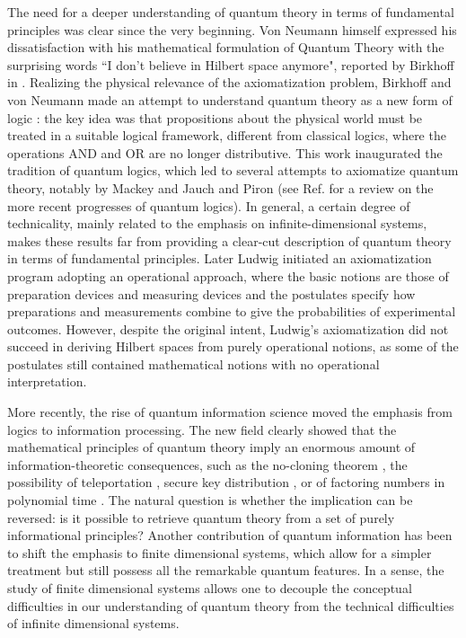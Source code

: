 \documentclass[12pt,aps,pra,showpacs,groupedaddress]{revtex4-1}
\begin{document}
The need for a deeper understanding of quantum theory in terms of  fundamental principles was clear
since the very beginning.  Von Neumann himself expressed his dissatisfaction with his mathematical formulation of Quantum Theory with the surprising words ``I don't believe in Hilbert space anymore", reported by Birkhoff in  \cite{Birk61}.  Realizing
the physical relevance of the axiomatization problem, Birkhoff and von Neumann made an attempt to understand quantum theory as a new form of logic \cite{BirkVN36}: the
key idea was that propositions about the physical world must be treated in a suitable logical framework, different from classical logics, where the operations AND and OR are no longer distributive.    This work inaugurated
the tradition of quantum logics, which led to several attempts to axiomatize quantum theory, notably
by Mackey \cite{Mack63} and Jauch and Piron \cite{JauPir63} (see Ref.  \cite{coeckerev} for a
review on the more recent progresses of quantum logics).  In general,  a certain degree of
technicality, mainly related to the emphasis on infinite-dimensional systems, makes these results far from providing a clear-cut description of quantum theory in terms of fundamental principles. Later Ludwig initiated an axiomatization
program \cite{Lud83} adopting an operational approach, where the basic notions are those of preparation devices and measuring devices and the postulates specify how preparations and measurements combine to give the probabilities of experimental outcomes.   
However, despite the original intent,  Ludwig's axiomatization did not succeed in deriving Hilbert spaces from purely operational notions, as some of the postulates still contained mathematical notions with no operational interpretation. 


More recently, the rise of quantum information science moved the emphasis from logics to
information processing. The new field clearly showed that  the mathematical principles of  quantum theory
imply an enormous amount of information-theoretic consequences,  such as the no-cloning theorem
\cite{wootterszurek,dieks}, the possibility of teleportation \cite{tele}, secure key distribution
\cite{wiesner,bb84,e91}, or of factoring numbers in polynomial time \cite{shor}.   The natural
question is whether the implication can be reversed:  is it possible to retrieve quantum theory
from a set  of purely informational principles? Another  contribution of quantum information has
been to shift the emphasis to finite dimensional systems, which allow for a simpler treatment but
still possess all the remarkable quantum features.    In a sense, the study of finite
dimensional systems allows one to decouple the conceptual difficulties in our understanding of quantum
theory from the technical difficulties of infinite dimensional systems.  
\end{document}

